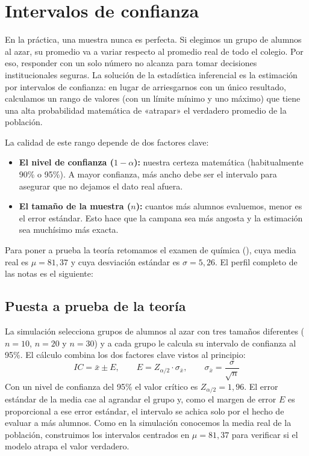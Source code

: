 \section{Intervalos de confianza}
En la práctica, una muestra nunca es perfecta. Si elegimos un grupo de alumnos al azar, su
promedio va a variar respecto al promedio real de todo el colegio. Por eso, responder con un
solo número no alcanza para tomar decisiones institucionales seguras. La solución de la
estadística inferencial es la estimación por intervalos de confianza: en lugar de arriesgarnos
con un único resultado, calculamos un rango de valores (con un límite mínimo y uno máximo) que
tiene una alta probabilidad matemática de «atrapar» el verdadero promedio de la población.

La calidad de este rango depende de dos factores clave:
\begin{itemize}
  \item \textbf{El nivel de confianza ($1 - \alpha$):} nuestra certeza matemática (habitualmente
    90\% o 95\%). A mayor confianza, más ancho debe ser el intervalo para asegurar que no    dejamos el dato real afuera.
  \item \textbf{El tamaño de la muestra ($n$):} cuantos más alumnos evaluemos, menor es el    error estándar. Esto hace que la campana sea más angosta y la estimación sea muchísimo más
    exacta.
\end{itemize}

\AnalisisDescriptivo
Para poner a prueba la teoría retomamos el examen de química (),
cuya media real es $\mu = 81{,}37$ y cuya desviación estándar es $\sigma = 5{,}26$. El perfil
completo de las notas es el siguiente:



\subsection{Puesta a prueba de la teoría}
La simulación selecciona grupos de alumnos al azar con tres tamaños diferentes ($n = 10$,
$n = 20$ y $n = 30$) y a cada grupo le calcula su intervalo de confianza al 95\%. El cálculo
combina los dos factores clave vistos al principio:
\begin{equation*}
  IC = \bar{x} \pm E, \qquad
  E = Z_{\alpha/2} \cdot \sigma_{\bar{x}}, \qquad
  \sigma_{\bar{x}} = \frac{\sigma}{\sqrt{n}}
\end{equation*}
 Con un nivel de confianza del 95\% el valor crítico es
$Z_{\alpha/2} = 1{,}96$. El error estándar de la media cae al agrandar el grupo y, como el
margen de error $E$ es proporcional a ese error estándar, el intervalo se achica solo por el
hecho de evaluar a más alumnos. Como en la simulación conocemos la media real de la población,
construimos los intervalos centrados en $\mu = 81{,}37$ para verificar si el modelo atrapa el
valor verdadero.

